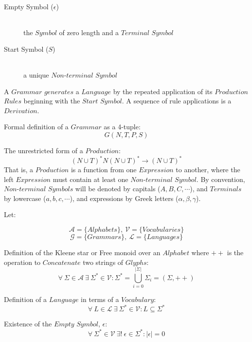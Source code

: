 \documentclass{article}
\begin{document}
    \begin{description}

    \item[Empty Symbol ($\epsilon$)] \hfill \\
    the $Symbol$ of zero length and a $Terminal$ $Symbol$

    \item[Start Symbol ($S$)] \hfill \\
    a unique $Non$-$terminal$ $Symbol$

    \end{description}

A $Grammar$ $generates$ a $Language$ by the repeated application of
its $Production$ $Rules$ beginning with the $Start$ $Symbol$. A
sequence of rule applications is a $Derivation$.

Formal definition of a $Grammar$ as a 4-tuple:
\[
    G(N,T,P,S)
\]

The unrestricted form of a $Production$:
\[
    (N \cup T)^*N(N \cup T)^* \rightarrow (N \cup T)^*
\]
That is, a $Production$ is a function from one $Expression$ to
another, where the left $Expression$ must contain at least one
$Non$-$terminal$ $Symbol$. By convention, $Non$-$terminal$ $Symbols$
will be denoted by capitals ($A,B,C,\cdots$), and $Terminals$ by
lowercase ($a,b,c,\cdots$), and expressions by Greek letters
($\alpha,\beta,\gamma$).

Let:

\[
    \mathcal{A} = \{ Alphabets \},\: \mathcal{V} = \{ Vocabularies \}
\] \[
    \mathcal{G} = \{ Grammars \},\: \mathcal{L} = \{ Languages \}
\]

    \begin{description}

    \item Definition of the Kleene star or Free monoid over an
      $Alphabet$ where $++$ is the operation to $Concatenate$ two
      strings of $Glyphs$:
    \[
        \forall \: \Sigma \in \mathcal{A} \:
        \exists \: \Sigma^* \in \mathcal{V}
        : \Sigma^* = \bigcup_{i=0}^{|\Sigma|} \Sigma_i
        = (\Sigma,++)
    \]

    \item Definition of a $Language$ in terms of a $Vocabulary$:
    \[
        \forall \: L \in \mathcal{L} \:
        \exists \: \Sigma^* \in \mathcal{V}
        : L \subseteq \Sigma^*
    \]

    \item Existence of the $Empty$ $Symbol$, $\epsilon$:
    \[
        \forall \: \Sigma^* \in \mathcal{V} \:
        \exists ! \: \epsilon \in \Sigma^*
        : |\epsilon|=0
    \]

    \end{description}
\end{document}
